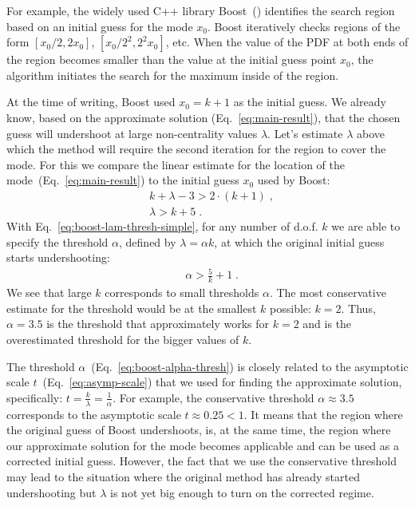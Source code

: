 \documentclass[final,5p,twocolumn,times,authoryear]{elsarticle}
\begin{document}
For example, the widely used C++ library Boost~(\cite{boost}) identifies the search region based on an initial guess for the mode $x_0$. Boost iteratively checks regions of the form $[x_0/2, 2x_0]$,  $[x_0/2^2, 2^2x_0]$, etc. When the value of the PDF at both ends of the region becomes smaller than the value at the initial guess point $x_0$, the algorithm initiates the search for the maximum inside of the region.

At the time of writing, Boost used $x_0 = k + 1$ as the initial guess. We already know, based on the approximate solution (Eq.~\ref{eq:main-result}), that the chosen guess will undershoot at large non-centrality values $\lambda$. Let's estimate $\lambda$ above which the method will require the second iteration for the region to cover the mode. For this we compare the linear estimate for the location of the mode~(Eq.~\ref{eq:main-result}) to the initial guess $x_0$ used by Boost:
%
\begin{align}
    &k + \lambda - 3 > 2 \cdot (k + 1)\;, \\
    &\lambda > k + 5 \label{eq:boost-lam-thresh-simple}\;.
\end{align}
%
With Eq.~\ref{eq:boost-lam-thresh-simple}, for any number of d.o.f. $k$ we are able to specify the threshold $\alpha$, defined by $\lambda  = \alpha k$, at which the original initial guess starts undershooting:
%
\begin{align}
    &\alpha > \frac{5}{k} + 1 \label{eq:boost-alpha-thresh}\;.
\end{align}
%
We see that large $k$ corresponds to small thresholds $\alpha$. The most conservative estimate for the threshold would be at the smallest $k$ possible: $k = 2$. Thus, $\alpha = 3.5$ is the threshold that approximately works for $k=2$ and is the overestimated threshold for the bigger values of $k$.

The threshold $\alpha$~(Eq.~\ref{eq:boost-alpha-thresh}) is closely related to the asymptotic scale $t$~(Eq.~\ref{eq:asymp-scale}) that we used for finding the approximate solution, specifically: $t = \frac{k}{\lambda} = \frac{1}{\alpha}$. For example, the conservative threshold $\alpha \approx 3.5$ corresponds to the asymptotic scale $t \approx 0.25 < 1$. It means that the region where the original guess of Boost undershoots, is, at the same time, the region where our approximate solution for the mode becomes applicable and can be used as a corrected initial guess. However, the fact that we use the conservative threshold may lead to the situation where the original method has already started undershooting but $\lambda$ is not yet big enough to turn on the corrected regime.
\end{document}
